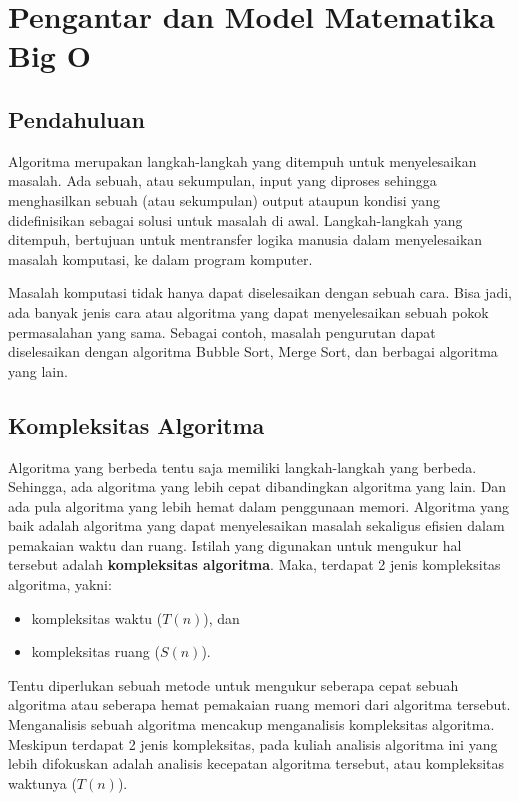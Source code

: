 \chapter{Pengantar dan Model Matematika Big O}\label{ch:modul1}

\section{Pendahuluan}
Algoritma merupakan langkah-langkah yang ditempuh untuk menyelesaikan masalah. Ada sebuah, atau sekumpulan, input yang diproses sehingga menghasilkan sebuah (atau sekumpulan) output ataupun kondisi yang didefinisikan sebagai solusi untuk masalah di awal. Langkah-langkah yang ditempuh, bertujuan untuk mentransfer logika manusia dalam menyelesaikan masalah komputasi, ke dalam program komputer.

Masalah komputasi tidak hanya dapat diselesaikan dengan sebuah cara. Bisa jadi, ada banyak jenis cara atau algoritma yang dapat menyelesaikan sebuah pokok permasalahan yang sama. Sebagai contoh, masalah pengurutan dapat diselesaikan dengan algoritma Bubble Sort, Merge Sort, dan berbagai algoritma yang lain.

\section{Kompleksitas Algoritma}
Algoritma yang berbeda tentu saja memiliki langkah-langkah yang berbeda. Sehingga, ada algoritma yang lebih cepat dibandingkan algoritma yang lain. Dan ada pula algoritma yang lebih hemat dalam penggunaan memori. Algoritma yang baik adalah algoritma yang dapat menyelesaikan masalah  sekaligus efisien dalam pemakaian waktu dan ruang. Istilah yang digunakan untuk mengukur hal tersebut adalah \textbf{kompleksitas algoritma}. Maka, terdapat 2 jenis kompleksitas algoritma, yakni:

\begin{itemize}
    \item kompleksitas waktu ($T(n)$), dan
    \item kompleksitas ruang ($S(n)$).
\end{itemize}

Tentu diperlukan sebuah metode untuk mengukur seberapa cepat sebuah algoritma atau seberapa hemat pemakaian ruang memori dari algoritma tersebut. Menganalisis sebuah algoritma mencakup menganalisis kompleksitas algoritma. Meskipun terdapat 2 jenis kompleksitas, pada kuliah analisis algoritma ini yang lebih difokuskan adalah analisis kecepatan algoritma tersebut, atau kompleksitas waktunya ($T(n)$).

